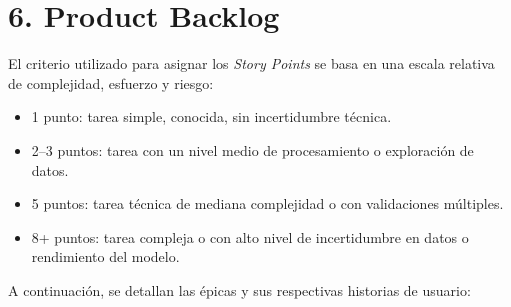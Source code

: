 \documentclass[
11pt, %
]{charter}
\begin{document}
\section{6. Product Backlog}
\label{sec:backlog}

El criterio utilizado para asignar los \textit{Story Points} se basa en una escala relativa de complejidad, esfuerzo y riesgo:
\begin{itemize}
  \item 1 punto: tarea simple, conocida, sin incertidumbre técnica.
  \item 2–3 puntos: tarea con un nivel medio de procesamiento o exploración de datos.
  \item 5 puntos: tarea técnica de mediana complejidad o con validaciones múltiples.
  \item 8+ puntos: tarea compleja o con alto nivel de incertidumbre en datos o rendimiento del modelo.
\end{itemize}

A continuación, se detallan las épicas y sus respectivas historias de usuario:
\end{document}
